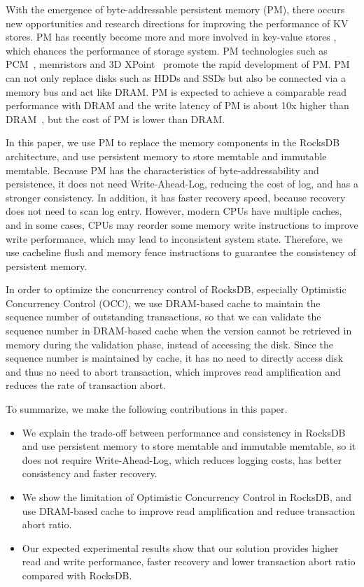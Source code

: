 With the emergence of byte-addressable persistent memory (PM), there occurs new opportunities and research directions for improving the performance of KV stores. PM has recently become more and more involved in key-value stores \cite{NVMRocks,DBLP:conf/usenix/KannanBGAA18,DBLP:conf/usenix/XiaJXS17}, which ehances the performance of storage system. PM technologies such as PCM~\cite{PCM}, memristors and 3D XPoint~\cite{3DXPoint} promote the rapid development of PM. PM can not only replace disks such as HDDs and SSDs but also be connected via a memory bus and act like DRAM. PM is expected to achieve a comparable read performance with DRAM and the write latency of PM is about 10x higher than DRAM~\cite{DBLP:conf/usenix/XiaJXS17}, but the cost of PM is lower than DRAM. 

In this paper, we use PM to replace the memory components in the RocksDB architecture, and use persistent memory to store memtable and immutable memtable. Because PM has the characteristics of byte-addressability and persistence, it does not need Write-Ahead-Log, reducing the cost of log, and has a stronger consistency. In addition, it has faster recovery speed, because recovery does not need to scan log entry. However, modern CPUs have multiple caches, and in some cases, CPUs may reorder some memory write instructions to improve write performance, which may lead to inconsistent system state. Therefore, we use cacheline flush and memory fence instructions to guarantee the consistency of persistent memory.

In order to optimize the concurrency control of RocksDB, especially Optimistic Concurrency Control (OCC), we use DRAM-based cache to maintain the sequence number of outstanding transactions, so that we can validate the sequence number in DRAM-based cache when the version cannot be retrieved in memory during the validation phase, instead of accessing the disk. Since the sequence number is maintained by cache, it has no need to directly access disk and thus no need to abort transaction, which improves read amplification and reduces the rate of transaction abort.

To summarize, we make the following contributions in this paper.
\begin{itemize}
\item We explain the trade-off between performance and consistency in RocksDB and use persistent memory to store memtable and immutable memtable, so it does not require Write-Ahead-Log, which reduces logging costs, has better consistency and faster recovery.
\item We show the limitation of Optimistic Concurrency Control in RocksDB, and use DRAM-based cache to improve read amplification and reduce transaction abort ratio.
\item Our expected experimental results show that our solution provides higher read and write performance, faster recovery and lower transaction abort ratio compared with RocksDB.
\end{itemize}

